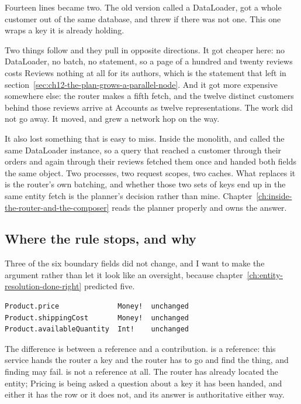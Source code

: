 Fourteen lines became two. The old version called a DataLoader, got a whole
customer out of the same database, and threw if there was not one. This one
wraps a key it is already holding.

%
Two things follow and they pull in opposite directions. It got cheaper here: no
DataLoader, no batch, no statement, so a page of a hundred and twenty reviews
costs Reviews nothing at all for its authors, which is the statement that left
in section~\ref{sec:ch12-the-plan-grows-a-parallel-node}. And it got more
expensive somewhere else: the router makes a fifth fetch, and the twelve
distinct customers behind those reviews arrive at Accounts as twelve
representations. The work did not go away. It moved, and grew a network hop on
the way.

It also lost something that is easy to miss. Inside the monolith,
 and  called the same DataLoader
instance, so a query that reached a customer through their orders and again
through their reviews fetched them once and handed both fields the same object.
Two processes, two request scopes, two caches. What replaces it is the router's
own batching, and whether those two sets of keys end up in the same entity fetch
is the planner's decision rather than mine.
Chapter~\ref{ch:inside-the-router-and-the-composer} reads the planner properly
and owns the answer.

\subsection*{Where the rule stops, and why}

%
Three of the six boundary fields did not change, and I want to make the argument
rather than let it look like an oversight, because
chapter~\ref{ch:entity-resolution-done-right} predicted five.

\begin{verbatim}
Product.price              Money!  unchanged
Product.shippingCost       Money!  unchanged
Product.availableQuantity  Int!    unchanged
\end{verbatim}

The difference is between a reference and a contribution. 
is a reference: this service hands the router a key and the router has to go and
find the thing, and finding may fail.  is not a reference at
all. The router has already located the entity; Pricing is being asked a
question about a key it has been handed, and either it has the row or it does
not, and its answer is authoritative either way.

